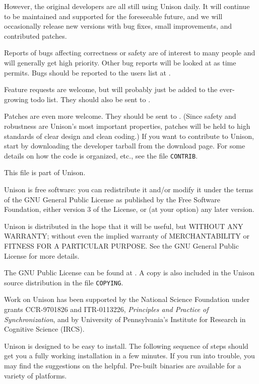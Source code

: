 \documentclass{article}
\begin{document}
However, the original developers are all still using Unison daily.  It
will continue to be maintained and supported for the foreseeable future,
and we will occasionally release new versions with bug fixes, small
improvements, and contributed patches.

Reports of bugs affecting correctness or safety are of interest to many
people and will generally get high priority.  Other bug reports will be
looked at as time permits.  Bugs should be reported to the users list at
\UNISONUSERS.

Feature requests are welcome, but will probably just be added to the
ever-growing todo list.  They should also be sent to \UNISONUSERS.

Patches are even more welcome.  They should be sent to
\UNISONHACKERS.
(Since safety and robustness are Unison's most important properties,
patches will be held to high standards of clear design and clean coding.)
If you want to contribute to Unison, start by downloading the developer
tarball from the download page.  For some details on how the code is
organized, etc., see the file {\tt CONTRIB}.


This file is part of Unison.

    Unison is free software: you can redistribute it and/or modify
    it under the terms of the GNU General Public License as published by
    the Free Software Foundation, either version 3 of the License, or
    (at your option) any later version.

    Unison is distributed in the hope that it will be useful,
    but WITHOUT ANY WARRANTY; without even the implied warranty of
    MERCHANTABILITY or FITNESS FOR A PARTICULAR PURPOSE.  See the
    GNU General Public License for more details.

    The GNU Public License can be found at
    .  A copy is also included in the
    Unison source distribution in the file {\tt COPYING}.


Work on Unison has been supported by the National Science Foundation
under grants CCR-9701826 and ITR-0113226, {\em Principles and Practice of
  Synchronization}, and by University of Pennsylvania's Institute for
Research in Cognitive Science (IRCS).


Unison is designed to be easy to install.  The following sequence of
steps should get you a fully working installation in a few minutes.  If
you run into trouble, you may find the suggestions on the
 helpful.  Pre-built binaries are available for a
variety of platforms.
\end{document}
